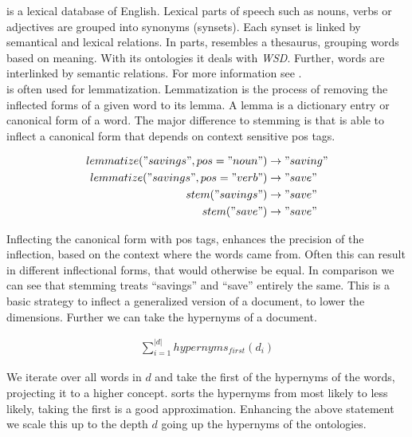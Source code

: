   \wordnet{} is a lexical database of English. Lexical parts of speech such as nouns, verbs or adjectives are grouped into synonyms (synsets). Each synset is linked by semantical and lexical relations. In parts, \wordnet{} resembles a thesaurus, grouping words based on meaning. With its ontologies it deals with \emph{WSD}. Further, words are interlinked by semantic relations. For more information see \cite{Wordnet1995, Wordnet1998}. \\
  \wordnet{} is often used for lemmatization. Lemmatization is the process of removing the inflected forms of a given word to its lemma. A lemma is a dictionary entry or canonical form of a word. The major difference to stemming is that \wordnet{} is able to inflect a canonical form that depends on context sensitive pos tags. 

    \begin{equation}
    \begin{split}
      lemmatize("savings", pos="noun") &\to "saving" \\
      lemmatize("savings", pos="verb") &\to "save" \\
      stem("savings") &\to "save" \\
      stem("save") &\to "save"
    \end{split}
    \end{equation}

  Inflecting the canonical form with pos tags, enhances the precision of the inflection, based on the context where the words came from. Often this can result in different inflectional forms, that would otherwise be equal. In comparison we can see that stemming treats ``savings'' and ``save'' entirely the same. This is a basic strategy to inflect a generalized version of a document, to lower the dimensions. Further we can take the hypernyms of a document.

    \begin{equation}
    \begin{split}
      \sum_{i=1}^{|d|} hypernyms_{first}(d_i)
    \end{split}
    \end{equation}

  We iterate over all words in $d$ and take the first of the hypernyms of the words, projecting it to a higher concept. \wordnet{} sorts the hypernyms from most likely to less likely, taking the first is a good approximation.
  Enhancing the above statement we scale this up to the depth $d$ going up the hypernyms of the \wordnet{} ontologies.

